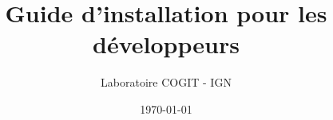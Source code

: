 \documentclass[a4paper,11pt]{report}
\begin{document}

\title{Guide d'installation pour les développeurs}
\author{Laboratoire COGIT - IGN}
\date{\today}



\maketitle



\tableofcontents








\end{document}
